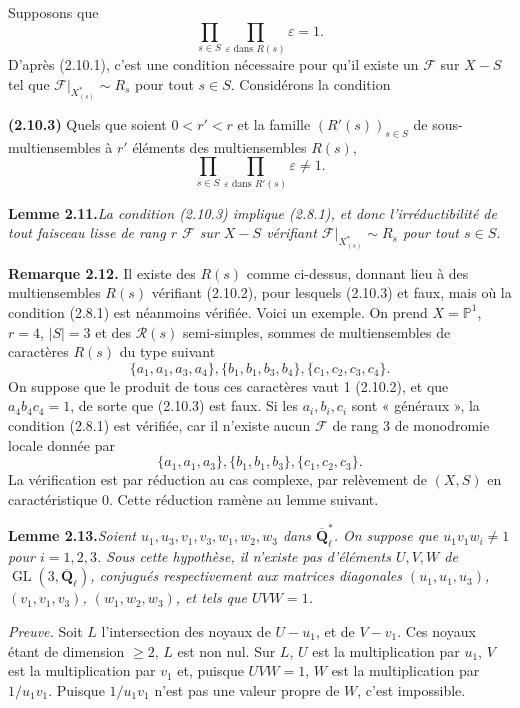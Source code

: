 \documentclass[11pt]{article}
\newcommand{\Qbl}{\overline{\mathbf{Q}}_{\ell}}
\newcommand{\GL}{\operatorname{GL}}
\newcommand{\Pone}{\mathbb{P}^{1}}
\newcommand{\Rcal}{\mathcal{R}}
\newcommand{\Fcal}{\mathcal{F}}
\newcommand{\para}[1]{\medskip\noindent\textbf{#1}\enspace}
\begin{document}
Supposons que
\begin{equation}
\prod_{s\in S}\prod_{\varepsilon\text{ dans }R(s)}\varepsilon=1.
\tag{2.10.2}
\end{equation}
D'après (2.10.1), c'est une condition nécessaire pour qu'il existe un \(\Fcal\) sur \(X-S\) tel que \(\Fcal|_{X^*_{(s)}}\sim R_s\) pour tout \(s\in S\). Considérons la condition

\para{(2.10.3)} Quels que soient \(0<r'<r\) et la famille \((R'(s))_{s\in S}\) de sous-multiensembles à \(r'\) éléments des multiensembles \(R(s)\),
\[
\prod_{s\in S}\prod_{\varepsilon\text{ dans }R'(s)}\varepsilon\ne 1.
\]

\noindent\textbf{Lemme 2.11.}\quad\textit{La condition (2.10.3) implique (2.8.1), et donc l'irréductibilité de tout faisceau lisse de rang \(r\) \(\Fcal\) sur \(X-S\) vérifiant \(\Fcal|_{X^*_{(s)}}\sim R_s\) pour tout \(s\in S\).}

\para{Remarque 2.12.} Il existe des \(R(s)\) comme ci-dessus, donnant lieu à des multiensembles \(R(s)\) vérifiant (2.10.2), pour lesquels (2.10.3) et faux, mais où la condition (2.8.1) est néanmoins vérifiée. Voici un exemple. On prend \(X=\Pone\), \(r=4\), \(|S|=3\) et des \(\Rcal(s)\) semi-simples, sommes de multiensembles de caractères \(R(s)\) du type suivant
\[
\{a_1,a_1,a_3,a_4\},\{b_1,b_1,b_3,b_4\},\{c_1,c_2,c_3,c_4\}.
\]
On suppose que le produit de tous ces caractères vaut 1 (2.10.2), et que \(a_4b_4c_4=1\), de sorte que (2.10.3) est faux. Si les \(a_i,b_i,c_i\) sont « généraux », la condition (2.8.1) est vérifiée, car il n'existe aucun \(\Fcal\) de rang \(3\) de monodromie locale donnée par
\[
\{a_1,a_1,a_3\},\{b_1,b_1,b_3\},\{c_1,c_2,c_3\}.
\]
La vérification est par réduction au cas complexe, par relèvement de \((X,S)\) en caractéristique \(0\). Cette réduction ramène au lemme suivant.

\noindent\textbf{Lemme 2.13.}\quad\textit{Soient \(u_1,u_3,v_1,v_3,w_1,w_2,w_3\) dans \(\Qbl^*\). On suppose que \(u_1v_1w_i\ne 1\) pour \(i=1,2,3\). Sous cette hypothèse, il n'existe pas d'éléments \(U,V,W\) de \(\GL(3,\Qbl)\), conjugués respectivement aux matrices diagonales \((u_1,u_1,u_3)\), \((v_1,v_1,v_3)\), \((w_1,w_2,w_3)\), et tels que \(UVW=1\).}

\noindent\textit{Preuve.} Soit \(L\) l'intersection des noyaux de \(U-u_1\), et de \(V-v_1\). Ces noyaux étant de dimension \(\geq 2\), \(L\) est non nul. Sur \(L\), \(U\) est la multiplication par \(u_1\), \(V\) est la multiplication par \(v_1\) et, puisque \(UVW=1\), \(W\) est la multiplication par \(1/u_1v_1\). Puisque \(1/u_1v_1\) n'est pas une valeur propre de \(W\), c'est impossible.
\end{document}
